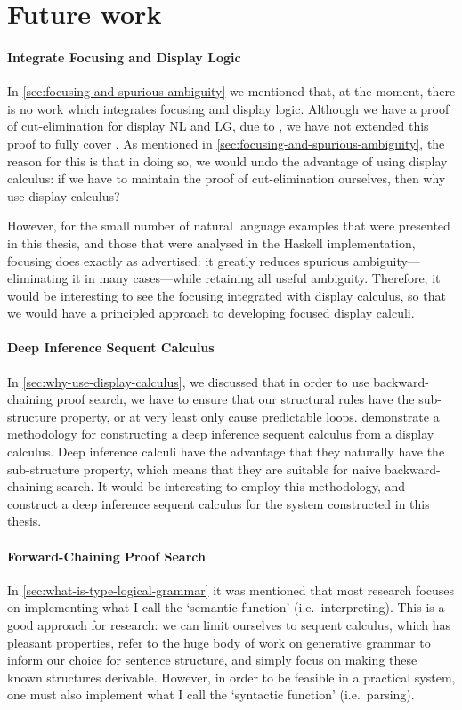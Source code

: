 \section{Future work}
\label{sec:future-work}

\paragraph*{Integrate Focusing and Display Logic}
In \autoref{sec:focusing-and-spurious-ambiguity} we mentioned that, at
the moment, there is no work which integrates focusing and display
logic. Although we have a proof of cut-elimination for display NL and
LG, due to \citet{bastenhof2011}, we have not extended this proof to
fully cover \NLBS.
As mentioned in \autoref{sec:focusing-and-spurious-ambiguity}, the
reason for this is that in doing so, we would undo the advantage of
using display calculus: if we have to maintain the proof of
cut-elimination ourselves, then why use display calculus?

However, for the small number of natural language examples that were
presented in this thesis, and those that were analysed in the Haskell
implementation, focusing does exactly as advertised: it greatly
reduces spurious ambiguity---eliminating it in many cases---while
retaining all useful ambiguity.
Therefore, it would be interesting to see the focusing integrated with
display calculus, so that we would have a principled approach to
developing focused display calculi.

\paragraph*{Deep Inference Sequent Calculus}
In \autoref{sec:why-use-display-calculus}, we discussed that in order
to use backward-chaining proof search, we have to ensure that our
structural rules have the sub-structure property, or at very least
only cause predictable loops. \citet{gore2014} demonstrate a
methodology for constructing a deep inference sequent calculus from a
display calculus. Deep inference calculi have the advantage that they
naturally have the sub-structure property, which means that they are
suitable for naive backward-chaining search. It would be interesting
to employ this methodology, and construct a deep inference sequent
calculus for the system constructed in this thesis.

\paragraph*{Forward-Chaining Proof Search}
In \autoref{sec:what-is-type-logical-grammar} it was mentioned that
most research focuses on implementing what I call the `semantic
function' (i.e.\ interpreting). This is a good approach for research:
we can limit ourselves to sequent calculus, which has pleasant
properties, refer to the huge body of work on generative grammar to
inform our choice for sentence structure, and simply focus on making
these known structures derivable. However, in order to be feasible in
a practical system, one must also implement what I call the `syntactic
function' (i.e.\ parsing).

